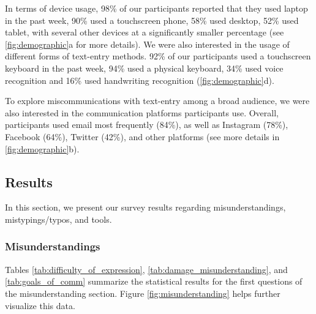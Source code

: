 \documentclass[acmsmall,screen,authorversion,nonacm]{acmart}
\newcommand{\QUOTE}[1]{\textsf{\textit{\textcolor{black}{``#1''}}}}
\begin{document}
In terms of device usage, 98\% of our participants reported that they used laptop in the past week, 90\% used a touchscreen phone, 58\% used desktop, 52\% used tablet, with several other devices at a significantly smaller percentage (see \autoref{fig:demographic}a for more details). We were also interested in the usage of different forms of text-entry methods. 92\% of our participants used a touchscreen keyboard in the past week, 94\% used a physical keyboard, 34\% used voice recognition and 16\% used handwriting recognition (\autoref{fig:demographic}d). 

To explore miscommunications with text-entry among a broad audience, we were also interested in the communication platforms participants use. Overall, participants used email most frequently (84\%), as well as Instagram (78\%), Facebook (64\%), Twitter (42\%), and other platforms (see more details in \autoref{fig:demographic}b). 

\subsection{Results}

In this section, we present our survey results regarding misunderstandings, mistypings/typos, and tools. 






\subsubsection{Misunderstandings}

Tables \ref{tab:difficulty_of_expression}, \ref{tab:damage_misunderstanding}, and \ref{tab:goals_of_comm} summarize the statistical results for the first questions of the misunderstanding section. Figure \ref{fig:misunderstanding} helps further visualize this data.

\end{document}
